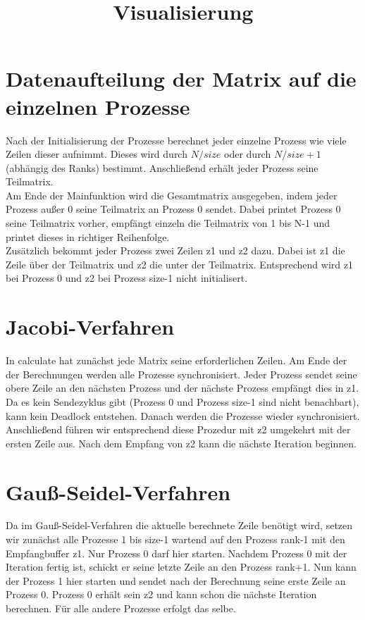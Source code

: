 \documentclass[fleqn]{article}
\title{Visualisierung}
\begin{document}
\section{Datenaufteilung der Matrix auf die einzelnen Prozesse}
Nach der Initialisierung der Prozesse
berechnet jeder einzelne Prozess wie viele Zeilen dieser aufnimmt. Dieses wird durch $N / size$ oder durch $N / size +1$ (abhängig des Ranks) bestimmt. Anschließend erhält jeder Prozess seine Teilmatrix.\\
Am Ende der Mainfunktion wird die Gesamtmatrix ausgegeben, indem jeder Prozess außer 0 seine Teilmatrix an Prozess 0 sendet. Dabei printet Prozess 0 seine Teilmatrix vorher, empfängt einzeln die Teilmatrix von 1 bis N-1 und printet dieses in richtiger Reihenfolge.\\
Zusätzlich bekommt jeder Prozess zwei Zeilen z1 und z2 dazu. Dabei ist z1 die Zeile über der Teilmatrix und z2 die unter der Teilmatrix. Entsprechend wird z1 bei Prozess 0 und z2 bei Prozess size-1 nicht initialisert.

\section{Jacobi-Verfahren}
In calculate hat zunächst jede Matrix seine erforderlichen Zeilen. Am Ende der der Berechnungen werden alle Prozesse synchronisiert. Jeder Prozess sendet seine obere Zeile an den nächsten Prozess und der nächste Prozess empfängt dies in z1. Da es kein Sendezyklus gibt (Prozess 0 und Prozess size-1 sind nicht benachbart),
kann kein Deadlock entstehen. Danach
werden die Prozesse wieder synchronisiert. Anschließend führen wir entsprechend diese Prozedur mit z2 umgekehrt mit der ersten Zeile aus. Nach dem Empfang von z2 kann die nächste Iteration beginnen.

\section{Gauß-Seidel-Verfahren}
Da im Gauß-Seidel-Verfahren die aktuelle berechnete Zeile benötigt wird, setzen wir zunächst alle Prozesse 1 bis size-1 wartend auf den Prozess rank-1 mit den Empfangbuffer z1. Nur Prozess 0 darf hier starten. Nachdem Prozess 0 mit der Iteration fertig ist, schickt er seine letzte Zeile an den Prozess rank+1. Nun kann der Prozess 1 hier starten und sendet nach der Berechnung seine erste Zeile an Prozess 0. Prozess 0 erhält sein z2 und kann schon die nächste Iteration berechnen.  Für alle andere Prozesse erfolgt das selbe.
\end{document}
